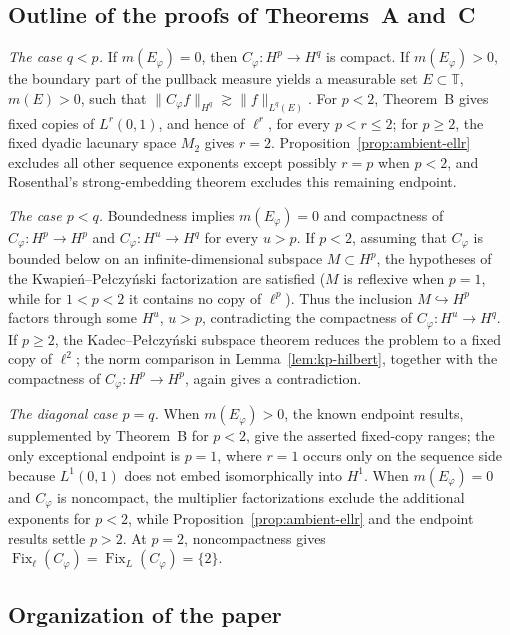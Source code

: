 \documentclass[10pt,a4paper]{amsart}
\newcommand{\T}{\mathbb{T}}
\begin{document}
\subsection*{Outline of the proofs of Theorems~A and~C}

\noindent\textit{The case \(q<p\).}
If \(m(E_\varphi)=0\), then \(C_\varphi:H^p\to H^q\) is compact.
If \(m(E_\varphi)>0\), the boundary part of the pullback measure
yields a measurable set \(E\subset\T\), \(m(E)>0\), such that
\(\|C_\varphi f\|_{H^q}
\gtrsim
\|f\|_{L^q(E)}.
\)
For \(p<2\), Theorem~B gives fixed copies of \(L^r(0,1)\), and hence
of \(\ell^r\), for every \(p<r\le2\); for \(p\ge2\), the fixed
dyadic lacunary space \(M_2\) gives \(r=2\).
Proposition~\ref{prop:ambient-ellr} excludes all other sequence
exponents except possibly \(r=p\) when \(p<2\), and Rosenthal's
strong-embedding theorem excludes this remaining endpoint.

\smallskip
\noindent\textit{The case \(p<q\).}
Boundedness implies \(m(E_\varphi)=0\) and compactness of
\(C_\varphi:H^p\to H^p\) and \(C_\varphi:H^u\to H^q\) for every
\(u>p\). If \(p<2\), assuming that \(C_\varphi\) is bounded below on
an infinite-dimensional subspace \(M\subset H^p\), the hypotheses of
the Kwapie\'n--Pe\l czy\'nski factorization are satisfied
(\(M\) is reflexive when \(p=1\), while for \(1<p<2\) it contains no
copy of \(\ell^p\)). Thus the inclusion \(M\hookrightarrow H^p\)
factors through some \(H^u\), \(u>p\), contradicting the compactness
of \(C_\varphi:H^u\to H^q\).
If \(p\ge2\), the Kadec--Pe\l czy\'nski subspace theorem reduces the
problem to a fixed copy of \(\ell^2\); the norm comparison in
Lemma~\ref{lem:kp-hilbert}, together with the compactness of
\(C_\varphi:H^p\to H^p\), again gives a contradiction.

\smallskip
\noindent\textit{The diagonal case \(p=q\).}
When \(m(E_\varphi)>0\), the known endpoint results, supplemented
by Theorem~B for \(p<2\), give the asserted fixed-copy ranges; the
only exceptional endpoint is \(p=1\), where \(r=1\) occurs only on
the sequence side because \(L^1(0,1)\) does not embed isomorphically
into \(H^1\). When \(m(E_\varphi)=0\) and \(C_\varphi\) is noncompact,
the multiplier factorizations exclude the additional exponents for
\(p<2\), while Proposition~\ref{prop:ambient-ellr} and the endpoint
results settle \(p>2\). At \(p=2\), noncompactness gives
\(\operatorname{Fix}_{\ell}(C_\varphi)
=\operatorname{Fix}_{L}(C_\varphi)=\{2\}\).

\subsection*{Organization of the paper}
\end{document}
